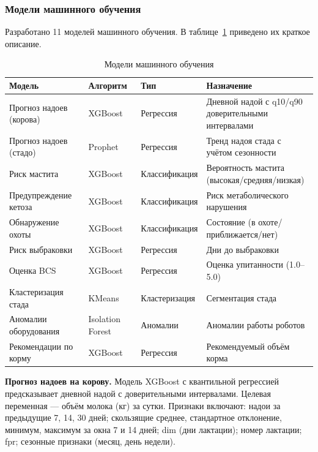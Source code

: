 \subsubsection{Модели машинного обучения}

Разработано 11 моделей машинного обучения. В таблице~\ref{mlmodels} приведено их краткое описание.

\begin{table}
  \caption{Модели машинного обучения}
  \small
  \begin{tabularx}{\textwidth}{|p{3.5cm}|l|p{3cm}|X|}
    \hline
    \textbf{Модель} & \textbf{Алгоритм} & \textbf{Тип} & \textbf{Назначение} \\
    \hline
    Прогноз надоев (корова) & XGBoost & Регрессия & Дневной надой с q10/q90 доверительными интервалами \\
    \hline
    Прогноз надоев (стадо) & Prophet & Регрессия & Тренд надоя стада с учётом сезонности \\
    \hline
    Риск мастита & XGBoost & Классификация & Вероятность мастита (высокая/средняя/низкая) \\
    \hline
    Предупреждение кетоза & XGBoost & Классификация & Риск метаболического нарушения \\
    \hline
    Обнаружение охоты & XGBoost & Классификация & Состояние (в охоте/приближается/нет) \\
    \hline
    Риск выбраковки & XGBoost & Регрессия & Дни до выбраковки \\
    \hline
    Оценка BCS & XGBoost & Регрессия & Оценка упитанности (1.0--5.0) \\
    \hline
    Кластеризация стада & KMeans & Кластеризация & Сегментация стада \\
    \hline
    Аномалии оборудования & Isolation Forest & Аномалии & Аномалии работы роботов \\
    \hline
    Рекомендации по корму & XGBoost & Регрессия & Рекомендуемый объём корма \\
    \hline
  \end{tabularx}
  \label{mlmodels}
\end{table}

\textbf{Прогноз надоев на корову.} Модель XGBoost с квантильной регрессией предсказывает дневной надой с доверительными интервалами. Целевая переменная --- объём молока (кг) за сутки. Признаки включают: надои за предыдущие 7, 14, 30 дней; скользящие среднее, стандартное отклонение, минимум, максимум за окна 7 и 14 дней; \acrshort{dim} (дни лактации); номер лактации; \acrshort{fpr}; сезонные признаки (месяц, день недели).

